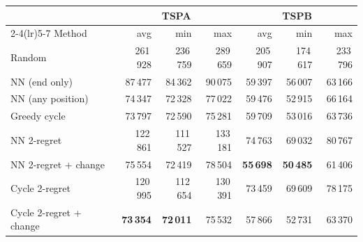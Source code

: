 \begin{tabular}{lrrrrrr}
\toprule
 & \multicolumn{3}{c}{TSPA} & \multicolumn{3}{c}{TSPB} \\
\cmidrule(lr){2-4}\cmidrule(lr){5-7}
Method & avg & min & max & avg & min & max \\
\midrule
Random & 261\,928 & 236\,759 & 289\,659 & 205\,907 & 174\,617 & 233\,796 \\
NN (end only) & 87\,477 & 84\,362 & 90\,075 & 59\,397 & 56\,007 & 63\,166 \\
NN (any position) & 74\,347 & 72\,328 & 77\,022 & 59\,476 & 52\,915 & 66\,164 \\
Greedy cycle & 73\,797 & 72\,590 & 75\,281 & 59\,709 & 53\,016 & 63\,736 \\
\midrule
NN 2-regret & 122\,861 & 111\,527 & 133\,181 & 74\,763 & 69\,032 & 80\,767 \\
NN 2-regret + change & 75\,554 & 72\,419 & 78\,504 & \textbf{55\,698} & \textbf{50\,485} & 61\,406 \\
Cycle 2-regret & 120\,995 & 112\,654 & 130\,391 & 73\,459 & 69\,609 & 78\,175 \\
Cycle 2-regret + change & \textbf{73\,354} & \textbf{72\,011} & 75\,532 & 57\,866 & 52\,731 & 63\,370 \\
\bottomrule
\end{tabular}
